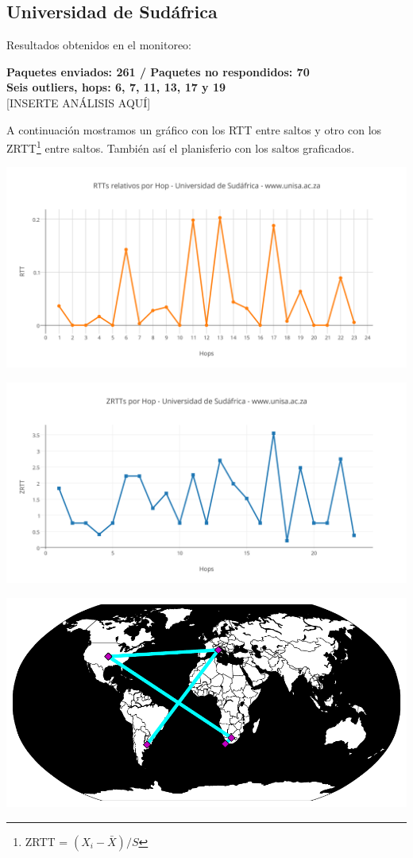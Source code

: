 \subsection{Universidad de Sudáfrica}

Resultados obtenidos en el monitoreo:\\

\smallskip

\bigskip

\textbf{Paquetes enviados: 261 / Paquetes no respondidos: 70}\\

\textbf{Seis outliers, hops: 6, 7, 11, 13, 17 y 19}\\

[INSERTE ANÁLISIS AQUÍ]

A continuación mostramos un gráfico con los RTT entre saltos y otro con los ZRTT\footnote{ZRTT = $(X_i - \bar{X}) / S$}  entre saltos. También así el planisferio con los saltos graficados.

\includegraphics[scale=0.65]{imagenes/sudafrica/RTTs.png} 

\includegraphics[scale=0.65]{imagenes/sudafrica/ZRTTs.png}

\begin{center}
\includegraphics[scale=0.8]{imagenes/sudafrica/sudafrica.pdf} 
\end{center}